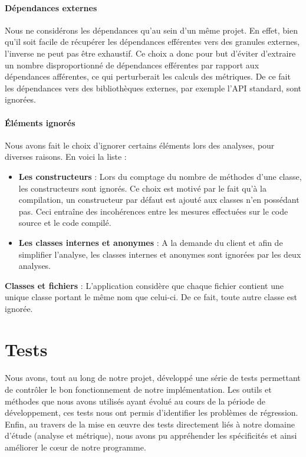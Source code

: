 \documentclass{scrartcl}
\begin{document}
        \paragraph{Dépendances externes}Nous ne considérons les dépendances qu'au sein d'un même projet. En effet, bien qu'il soit facile de récupérer les dépendances efférentes vers des granules externes, l'inverse ne peut pas être exhaustif. Ce choix a donc pour but d'éviter d'extraire un nombre disproportionné de dépendances efférentes par rapport aux dépendances afférentes, ce qui perturberait les calculs des métriques. De ce fait les dépendances vers des bibliothèques externes, par exemple l'API standard, sont ignorées.
        
        \paragraph{Éléments ignorés}Nous avons fait le choix d'ignorer certains éléments lors des analyses, pour diverses raisons. En voici la liste :
        \begin{itemize}
            \item \textbf{Les constructeurs} : Lors du comptage du nombre de méthodes d'une classe, les constructeurs sont ignorés. Ce choix est motivé par le fait qu'à la compilation, un constructeur par défaut est ajouté aux classes n'en possédant pas. Ceci entraîne des incohérences entre les mesures effectuées sur le code source et le code compilé.
            \item \textbf{Les classes internes et anonymes} : A la demande du client et afin de simplifier l'analyse, les classes internes et anonymes sont ignorées par les deux analyses.
        \end{itemize}
        \textbf{Classes et fichiers} : L'application considère que chaque fichier contient une unique classe portant le même nom que celui-ci. De ce fait, toute autre classe est ignorée.
        
\newpage
\section{Tests}
    \paragraph{}Nous avons, tout au long de notre projet, développé une série de tests permettant de contrôler le bon fonctionnement de notre implémentation. Les outils et méthodes que nous avons utilisés ayant évolué au cours de la période de développement, ces tests nous ont permis d'identifier les problèmes de régression. Enfin, au travers de la mise en œuvre des tests directement liés à notre domaine d’étude (analyse et métrique), nous avons pu appréhender les spécificités et ainsi améliorer le cœur de notre programme.
    
\end{document}
